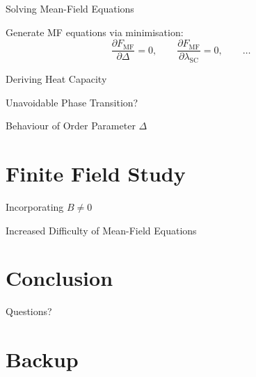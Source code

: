 \documentclass[13pt]{beamer}
\begin{document}
  \begin{frame}{Solving Mean-Field Equations}

  Generate MF equations via minimisation:
  $$ \frac{\partial F_{\text{MF}}}{\partial \Delta} = 0, \qquad \frac{\partial F_{\text{MF}}}{\partial \lambda_{\text{SC}}} = 0, \qquad \ldots $$

  \end{frame}

  \begin{frame}{Deriving Heat Capacity}
  \end{frame}

  \begin{frame}{Unavoidable Phase Transition?}
  \end{frame}

  \begin{frame}{Behaviour of Order Parameter $ \Delta $}
  \end{frame}

  \section{Finite Field Study}

  \begin{frame}{Incorporating $ B \neq 0 $}
  \end{frame}

  \begin{frame}{Increased Difficulty of Mean-Field Equations}
  \end{frame}

  \section{Conclusion}

  \begin{frame}[standout]
  Questions?
  \end{frame}

  \appendix

  \section{Backup}
\end{document}
